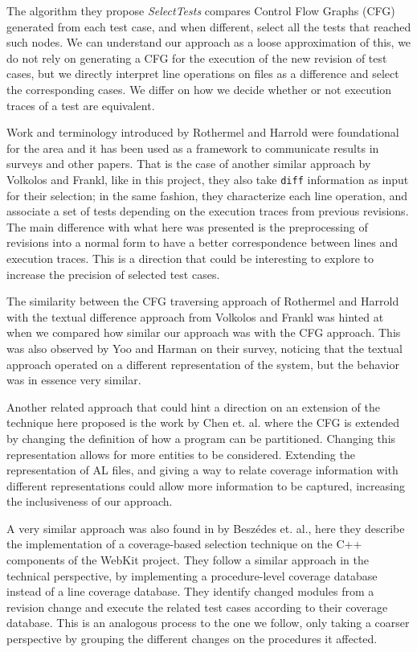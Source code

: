\documentclass{article}
\begin{document}
The algorithm they propose \emph{SelectTests} compares Control Flow Graphs (CFG) generated from each test case, and when different, select all the tests that reached such nodes. We can understand our approach as a loose approximation of this, we do not rely on generating a CFG for the execution of the new revision of test cases, but we directly interpret line operations on files as a difference and select the corresponding cases. We differ on how we decide whether or not execution traces of a test are equivalent.

Work and terminology introduced by Rothermel and Harrold were foundational for the area and it has been used as a framework to communicate results in surveys and other papers. That is the case of another similar approach by Volkolos and Frankl, like in this project, they also take \texttt{diff} information as input for their selection; in the same fashion, they characterize each line operation, and associate a set of tests depending on the execution traces from previous revisions. The main difference with what here was presented is the preprocessing of revisions into a normal form to have a better correspondence between lines and execution traces. This is a direction that could be interesting to explore to increase the precision of selected test cases.

The similarity between the CFG traversing approach of Rothermel and Harrold with the textual difference approach from Volkolos and Frankl was hinted at when we compared how similar our approach was with the CFG approach. This was also observed by Yoo and Harman on their survey, noticing that the textual approach operated on a different representation of the system, but the behavior was in essence very similar.

Another related approach that could hint a direction on an extension of the technique here proposed is the work by Chen et. al. \cite{chen} where the CFG is extended by changing the definition of how a program can be partitioned. Changing this representation allows for more entities to be considered. Extending the representation of AL files, and giving a way to relate coverage information with different representations could allow more information to be captured, increasing the inclusiveness of our approach.

A very similar approach was also found in \cite{6405252} by Beszédes et. al., here they describe the implementation of a coverage-based selection technique on the C++ components of the WebKit project. They follow a similar approach in the technical perspective, by implementing a procedure-level coverage database instead of a line coverage database. They identify changed modules from a revision change and execute the related test cases according to their coverage database. This is an analogous process to the one we follow, only taking a coarser perspective by grouping the different changes on the procedures it affected.
\end{document}

